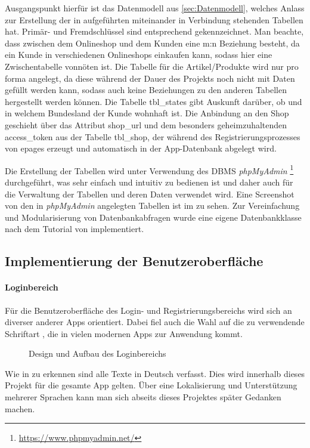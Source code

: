 Ausgangspunkt hierfür ist das Datenmodell aus \ref{sec:Datenmodell}, welches Anlass zur Erstellung der in  aufgeführten miteinander in Verbindung stehenden Tabellen hat. Primär- und Fremdschlüssel sind entsprechend gekennzeichnet. Man beachte, dass zwischen dem Onlineshop und dem Kunden eine m:n Beziehung besteht, da ein Kunde in verschiedenen Onlineshops einkaufen kann, sodass hier eine Zwischentabelle vonnöten ist. Die Tabelle für die Artikel/Produkte wird nur pro forma angelegt, da diese während der Dauer des Projekts noch nicht mit Daten gefüllt werden kann, sodass auch keine Beziehungen zu den anderen Tabellen hergestellt werden können. Die Tabelle tbl\_states gibt Auskunft darüber, ob und in welchem Bundesland der Kunde wohnhaft ist. Die Anbindung an den Shop geschieht über das Attribut shop\_url und dem besonders geheimzuhaltenden access\_token aus der Tabelle tbl\_shop, der während des Registrierungsprozesses von epages erzeugt und automatisch in der App-Datenbank abgelegt wird.

Die Erstellung der Tabellen wird unter Verwendung des \acs{DBMS} \textit{phpMyAdmin} \footnote{\url{https://www.phpmyadmin.net/}} durchgeführt, was sehr einfach und intuitiv zu bedienen ist und daher auch für die Verwaltung der Tabellen und deren Daten verwendet wird. Eine Screenshot von den in \textit{phpMyAdmin} angelegten Tabellen ist im  zu sehen. Zur Vereinfachung und Modularisierung von Datenbankabfragen wurde eine eigene Datenbankklasse nach dem Tutorial von \cite{Arthur} implementiert.

\subsection{Implementierung der Benutzeroberfläche}
\label{sec:ImplementierungBenutzeroberflaeche}

\paragraph{Loginbereich} Für die Benutzeroberfläche des Login- und Registrierungsbereichs wird sich an diverser anderer Apps orientiert. Dabei fiel auch die Wahl auf die zu verwendende Schriftart , die in vielen modernen Apps zur Anwendung kommt.
\begin{figure}[htb]
\centering
{}
\caption{Design und Aufbau des Loginbereichs}
\label{fig:loginbereich}
\end{figure} 
Wie in  zu erkennen sind alle Texte in Deutsch verfasst. Dies wird innerhalb dieses Projekt für die gesamte App gelten. Über eine Lokalisierung und Unterstützung mehrerer Sprachen kann man sich abseits dieses Projektes später Gedanken machen.
\newpage
